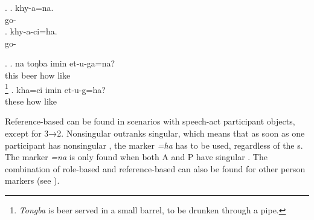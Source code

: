 \ex. \ag. khy-a=na.\\
go-\\
\bg. khy-a-ci=ha.\\
go-\\


\ex.  \ag. 	na toŋba imin et-u-ga=na?\\
			this beer how like\\
			\footnote{\emph{Tongba} is  beer served in a small barrel, to be drunken through a pipe.}
	\bg.	kha=ci imin et-u-g=ha?\\
			these how like\\ 



Reference-based  can be found in scenarios with speech-act participant objects, except for 3→2. Nonsingular  outranks singular, which means that as soon as one participant has nonsingular , the marker \emph{=ha} has to be used, regardless of the s. The marker \emph{=na} is only found when both A and P have singular . The combination of role-based and reference-based  can also be found for other person markers (see ).

\begin{table}[htp]
\caption{Alignment of the nominalizers \emph{=na} and \emph{=ha}}\label{nmlz-uni-table}
\end{table}     


